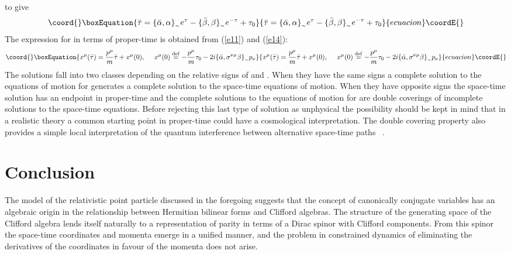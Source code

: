 \documentclass[a4paper,a4paper]{article}
\begin{document}
to give
\begin{equation}\coord{}\boxEquation{
\bar{\tau }=\{\bar{\alpha },\alpha \}_{_{\sim }}e^{\tau }-\{\bar{\beta  },\beta 
\}_{_{\sim }}e^{-\tau} + \tau _{0}
\label{e14}
}{
\bar{\tau }=\{\bar{\alpha },\alpha \}_{_{\sim }}e^{\tau }-\{\bar{\beta  },\beta 
\}_{_{\sim }}e^{-\tau} + \tau _{0}
}{ecuacion}\coordE{}\end{equation}
The expression for \coordHE{} in terms of proper-time is obtained from (\ref{e11}) and
(\ref{e14}):
\begin{equation}\coord{}\boxEquation{
x^{\mu }(\bar{\tau })= \frac{p^{\mu }}{m}\bar{\tau }+x^{\mu }(0),\ \ \ \ x^{\mu
}(0)\stackrel{ \mathrm{def}}{=} -\frac{p^{\mu }}{m}\tau _{0}-2i\{\bar{\alpha
},\sigma ^{\nu \mu }\beta\}_{_{\sim }}p_{\nu }
\label{e15} 
}{
x^{\mu }(\bar{\tau })= \frac{p^{\mu }}{m}\bar{\tau }+x^{\mu }(0),\ \ \ \ x^{\mu
}(0)\stackrel{ \mathrm{def}}{=} -\frac{p^{\mu }}{m}\tau _{0}-2i\{\bar{\alpha
},\sigma ^{\nu \mu }\beta\}_{_{\sim }}p_{\nu }
}{ecuacion}\coordE{}\end{equation}
The solutions fall into two classes depending on the relative signs of
\myHighlight{$\{\bar{\alpha },\alpha \}_{_{\sim }}$}\coordHE{} and \myHighlight{$\{\bar{\beta  },\beta  \}_{_{\sim
}}$}\coordHE{}. When they have the same signs a complete solution to the equations of
motion for \myHighlight{$\psi$}\coordHE{} generates a complete solution to the space-time equations of
motion. When they have opposite signs the space-time solution has an endpoint in
proper-time and the complete solutions to the equations of motion for \myHighlight{$\psi$}\coordHE{}
are
double coverings of incomplete solutions to the space-time equations. Before
rejecting this last type of solution as unphysical the possibility should be
kept in mind that in a realistic theory a common starting point in proper-time
could have a cosmological interpretation. The double covering property also
provides a simple local interpretation of the quantum interference between
alternative space-time paths ~\cite{borch4}. 
\section{Conclusion}
The model of the relativistic point particle discussed in the foregoing
suggests that the concept of canonically conjugate variables has an algebraic
origin in the relationship between Hermitian bilinear forms and Clifford
algebras. The \coordHE{} structure of the generating space of the Clifford
algebra lends itself naturally to a representation of parity in terms of a Dirac
spinor with Clifford components. From this spinor the space-time coordinates
and momenta emerge in a unified manner, and the problem in constrained dynamics
of eliminating the derivatives of the coordinates in favour of the momenta does
not arise. 
\end{document}
